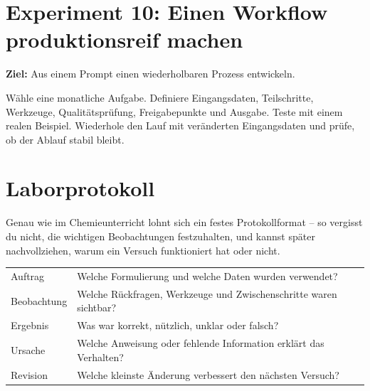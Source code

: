 \section{Experiment 10: Einen Workflow produktionsreif machen}

\textbf{Ziel:} Aus einem Prompt einen wiederholbaren Prozess entwickeln.

Wähle eine monatliche Aufgabe. Definiere Eingangsdaten, Teilschritte, Werkzeuge, Qualitätsprüfung, Freigabepunkte und Ausgabe. Teste mit einem realen Beispiel. Wiederhole den Lauf mit veränderten Eingangsdaten und prüfe, ob der Ablauf stabil bleibt.

\section{Laborprotokoll}

Genau wie im Chemieunterricht lohnt sich ein festes Protokollformat -- so vergisst du nicht, die wichtigen Beobachtungen festzuhalten, und kannst später nachvollziehen, warum ein Versuch funktioniert hat oder nicht.

\begin{tabularx}{\textwidth}{@{}p{}X@{}}\toprule
Auftrag&Welche Formulierung und welche Daten wurden verwendet?\\
Beobachtung&Welche Rückfragen, Werkzeuge und Zwischenschritte waren sichtbar?\\
Ergebnis&Was war korrekt, nützlich, unklar oder falsch?\\
Ursache&Welche Anweisung oder fehlende Information erklärt das Verhalten?\\
Revision&Welche kleinste Änderung verbessert den nächsten Versuch?\\\bottomrule
\end{tabularx}
